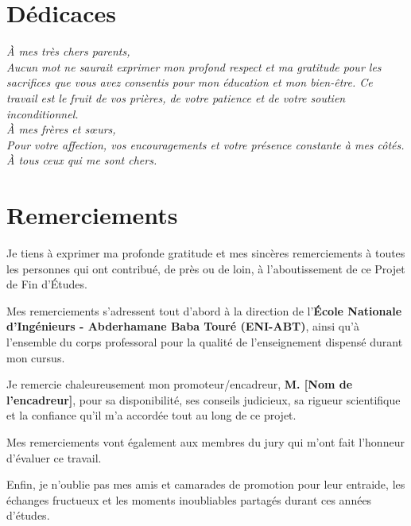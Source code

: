 
\chapter*{Dédicaces}

\vspace{2cm}
\begin{center}
    \begin{minipage}{0.8\textwidth}
        \large\itshape
        À mes très chers parents,\\[0.5cm]
        Aucun mot ne saurait exprimer mon profond respect et ma gratitude pour les sacrifices que vous avez consentis pour mon éducation et mon bien-être. Ce travail est le fruit de vos prières, de votre patience et de votre soutien inconditionnel.\\[1cm]
        À mes frères et sœurs,\\[0.5cm]
        Pour votre affection, vos encouragements et votre présence constante à mes côtés.\\[1cm]
        À tous ceux qui me sont chers.
    \end{minipage}
\end{center}

\newpage
\chapter*{Remerciements}

\vspace{1cm}
Je tiens à exprimer ma profonde gratitude et mes sincères remerciements à toutes les personnes qui ont contribué, de près ou de loin, à l'aboutissement de ce Projet de Fin d'Études.

\vspace{0.5cm}
Mes remerciements s'adressent tout d'abord à la direction de l'\textbf{École Nationale d'Ingénieurs - Abderhamane Baba Touré (ENI-ABT)}, ainsi qu'à l'ensemble du corps professoral pour la qualité de l'enseignement dispensé durant mon cursus.

\vspace{0.5cm}
Je remercie chaleureusement mon promoteur/encadreur, \textbf{M. [Nom de l'encadreur]}, pour sa disponibilité, ses conseils judicieux, sa rigueur scientifique et la confiance qu'il m'a accordée tout au long de ce projet.

\vspace{0.5cm}
Mes remerciements vont également aux membres du jury qui m'ont fait l'honneur d'évaluer ce travail.

\vspace{0.5cm}
Enfin, je n'oublie pas mes amis et camarades de promotion pour leur entraide, les échanges fructueux et les moments inoubliables partagés durant ces années d'études.
